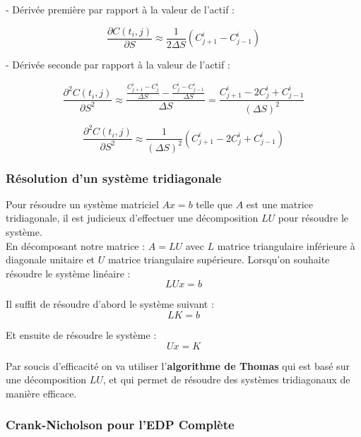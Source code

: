 \documentclass[11pt,a4paper]{article}
\begin{document}
\vspace{0.2cm}

- Dérivée première par rapport à la valeur de l'actif :

\begin{equation}
\boxed{\frac{\partial C(t_{i},j)}{\partial S} \approx \frac{1}{2 \Delta S} (C_{j+1}^{i} - C_{j-1}^{i})}
\end{equation}

\vspace{0.2cm}

- Dérivée seconde par rapport à la valeur de l'actif :

$$\frac{\partial^2 C(t_{i},j)}{\partial S^2} \approx \frac{\frac{C_{j+1}^{i} - C_{j}^{i}}{\Delta S} - \frac{C_{j}^{i} - C_{j-1}^{i}}{\Delta S}}{\Delta S} = \frac{C_{j+1}^{i}-2C_{j}^{i}+C_{j-1}^{i}}{(\Delta S)^2} $$

\begin{equation}
\boxed{\frac{\partial^2 C(t_{i},j)}{\partial S^2} \approx \frac{1}{(\Delta S)^2} (C_{j+1}^{i} -2C_{j}^{i} + C_{j-1}^{i})}
\end{equation}

\subsubsection{Résolution d'un système tridiagonale}

Pour résoudre un système matriciel $Ax = b$ telle que $A$ est une matrice tridiagonale, il est judicieux d'effectuer une décomposition $LU$ pour résoudre le système.\\

En décomposant notre matrice : $A = LU$ avec $L$ matrice triangulaire inférieure à diagonale unitaire et $U$ matrice triangulaire supérieure. Lorsqu'on souhaite résoudre le système linéaire : $$LUx = b$$ 

Il suffit de résoudre d'abord le système suivant : $$LK= b$$

Et ensuite de résoudre le système : $$Ux = K$$

Par soucis d'efficacité on va utiliser l'\textbf{algorithme de Thomas} qui est basé sur une décomposition $LU$, et qui permet de résoudre des systèmes tridiagonaux de manière efficace.

\newpage

\subsubsection{Crank-Nicholson pour l'EDP Complète}
\end{document}
